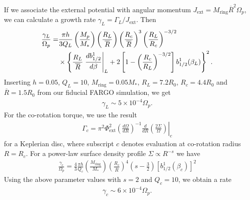 If we associate the external potential with angular momentum 
$J_\mathrm{ext}  = M_\mathrm{ring}\overline{R}^2\Omega_p$, we can
calculate a growth rate $\gamma_L=\Gamma_L/J_\mathrm{ext}$. Then 
\begin{align}
  \frac{\gamma_L}{\Omega_p} = &\frac{\pi
    h}{3Q_L}\left(\frac{M_p}{M_*}\right)\left(\frac{R_L}{\overline{R}}\right)\left(\frac{R_c}{\overline{R}}\right) 
  ^3\left(\frac{R_L}{R_c}\right)^{-3/2}\notag\\ 
  &\times
  \left\{\frac{R_L}{\overline{R}}\left.\frac{db_{1/2}^1}{d\beta}\right|_L
    + 2\left[1 - 
      \left(\frac{R_c}{R_L}\right)^{-3/2}\right]b_{1/2}^1(\beta_L)\right\}^2. 
\end{align}
Inserting $h=0.05$, $Q_L=10$, $M_\mathrm{ring} = 0.05M_*$,
$R_L=7.2R_0$, $R_c=4.4R_0$ and $\overline{R}=1.5R_0$ from our fiducial
FARGO simulation, we get
\begin{align}
  \gamma_L \sim 5\times10^{-4}\Omega_p. 
\end{align}
For the co-rotation torque, we use the result
\begin{align}
  \Gamma_c = \left.
    \pi^2\Phi_\mathrm{ext}^2\left(\frac{d\Omega}{dR}\right)^{-1}\frac{d}{dR}\left(\frac{2\Sigma}{\Omega}\right)\right|_{c}     
\end{align}
for a Keplerian disc, where subscript $c$ denotes evaluation at
co-rotation radius $R=R_c$. For a power-law surface density profile
$\Sigma\propto R^{-s}$ we have
\begin{align}
\frac{\gamma_c}{\Omega_p} = \frac{4}{3}\frac{\pi h}{Q_c}
\left(\frac{M_\mathrm{ring}}{M_*}\right)\left(\frac{R_c}{\overline{R}}\right)^4\left(s-\frac{3}{2}\right) 
\left[b_{1/2}^1(\beta_c)\right]^2    
\end{align}
Using the above parameter values with $s=2$ and $Q_c=10$, we obtain a
rate
\begin{align}
  \gamma_c\sim 6\times 10^{-4}\Omega_p. 
\end{align}
